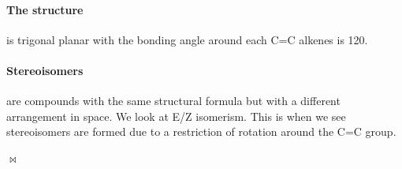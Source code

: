 \documentclass[11pt,a4paper]{memoir}
\begin{document}
	\paragraph{The structure} is trigonal planar with the bonding angle around each C=C alkenes is 120\degree .
	
	\paragraph{Stereoisomers} are compounds with the same structural formula but with a different arrangement in space. We look at E/Z isomerism. This is when we see stereoisomers are formed due to a restriction of rotation around the C=C group.
	
	$\bowtie$
\end{document}
